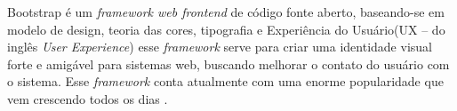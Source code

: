 Bootstrap é um \textit{framework web frontend} de código fonte aberto, baseando-se em modelo de design, teoria das cores, tipografia e Experiência do Usuário(UX – do inglês \textit{User Experience}) esse \textit{framework} serve para criar uma identidade visual forte e amigável para sistemas web, buscando melhorar o contato do usuário com o sistema\cite{bootstrapwikipedia}. Esse \textit{framework} conta atualmente com uma enorme popularidade que vem crescendo todos os dias \cite{jain2014review}. \par







